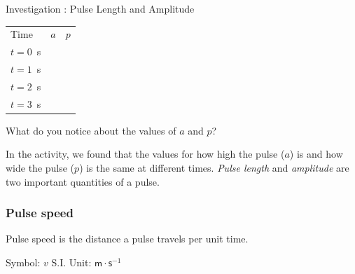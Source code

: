 \begin{g_experiment}{Investigation : Pulse Length and Amplitude }
\begin{table}[H]
\begin{center}
      \begin{xtabular}[t]{|l|l|l|}\hline
        Time &
                  $a$
                 &
                  $p$
     \tabularnewline{}
        $t=0$~s &
         &
     \tabularnewline{}
        $t=1$~s &
         &
     \tabularnewline{}
        $t=2$~s &
         &
     \tabularnewline{}
        $t=3$~s &
         &
     \tabularnewline{}
    \end{xtabular}
      \end{center}
\end{table}
    \par
        \label{m38801*id313222}What do you notice about the values of $a$ and $p$?
 \par 
        \label{m38801*id313246}In the activity, we found that the values for how high the pulse ($a$) is and how wide the pulse ($p$) is the same at different times. \textsl{Pulse length} and \textsl{amplitude} are two important quantities of a pulse.\par 
      \label{m38801*uid3}

\end{g_experiment}

            \subsubsection*{Pulse speed}
            \nopagebreak
\par
            { \label{m38801*meaningfhsst!!!underscore!!!id145}
        \label{m38801*id313292}Pulse speed is the distance a pulse travels per unit time. \par 
	    Symbol: $v$ \hspace{2cm} S.I. Unit: $\mathsf{m}\cdot \mathsf{s}^{-1}$
         } 
        
